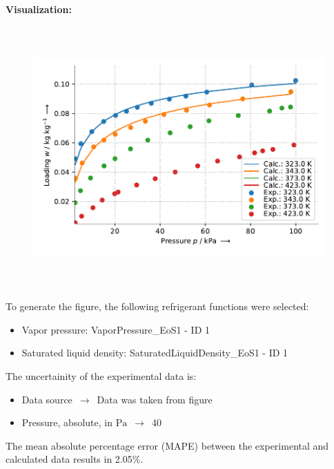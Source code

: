 \textbf{Visualization:}
%
\begin{figure}[!htp]
{\noindent\includegraphics[height=10cm, keepaspectratio]{figs/ads/ads_Propane_zeolite_pellet_5A_DubininAstakhov_1.pdf}}
\end{figure}
%

To generate the figure, the following refrigerant functions were selected:
\begin{itemize}
\item Vapor pressure: VaporPressure\_EoS1 - ID 1
\item Saturated liquid density: SaturatedLiquidDensity\_EoS1 - ID 1
\end{itemize}

The uncertainity of the experimental data is:
\begin{itemize}
\item Data source $\,\to\,$ Data was taken from figure
\item Pressure, absolute, in $\si{\pascal}$ $\,\to\,$ 40
\end{itemize}

The mean absolute percentage error (MAPE) between the experimental and calculated data results in 2.05\%.
\FloatBarrier
\newpage
